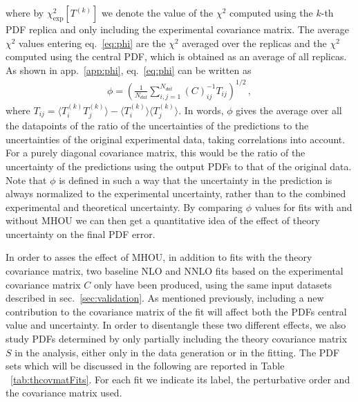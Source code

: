     where by $\chi^2_{\text{exp}}\left[T^{(k)}\right]$ we denote the value of the $\chi^2$
    computed using the $k$-th PDF replica and only including the experimental covariance matrix.
    The average $\chi^2$ values entering eq.~\eqref{eq:phi} are the $\chi^2$ averaged over the replicas
    and the $\chi^2$ computed using the central PDF, which is obtained as an average of all replicas. 
    As shown in app.~\ref{app:phi}, eq.~\eqref{eq:phi} can be written as
    \begin{align}
        \phi = \left(\frac{1}{N_{dat}}\sum_{i,j=1}^{N_{dat}} \left(C\right)^{-1}_{ij}T_{ij}\right)^{1/2}\,,
    \end{align}
    where $T_{ij} = \langle T^{(k)}_i T^{(k)}_j \rangle - \langle T^{(k)}_i \rangle \langle T^{(k)}_j \rangle$. In words,
    $\phi$ gives the average over all the datapoints of the ratio of the uncertainties of the predictions
    to the uncertainties of the original experimental data, taking correlations into account. For a purely diagonal
    covariance matrix, this would be the ratio of the uncertainty of the predictions using the output PDFs
    to that of the original data. Note that  $\phi$ is defined in such a way that the uncertainty in the prediction is always
    normalized to the experimental uncertainty, rather than to the combined experimental and theoretical uncertainty.
    By comparing $\phi$ values for fits with and without MHOU we can then get a quantitative idea of the effect of theory
    uncertainty on the final PDF error.

    In order to asses the effect of MHOU, in addition to fits with the theory covariance matrix, two baseline
    NLO and NNLO fits based on the experimental covariance matrix $C$ only have been produced, 
    using the same input datasets described in sec.~\ref{sec:validation}. 
    As mentioned previously, including a new contribution to the covariance matrix of the fit
    will affect both the PDFs central value and uncertainty. In order to disentangle these
    two different effects, we also study PDFs determined by only partially 
    including the theory covariance matrix $S$ in the analysis, either only in the data generation or in the fitting. 
    The PDF sets which will be discussed in the following are reported in Table ~\ref{tab:thcovmatFits}. 
    For each fit we indicate its label, the perturbative order and the covariance matrix used.
    

